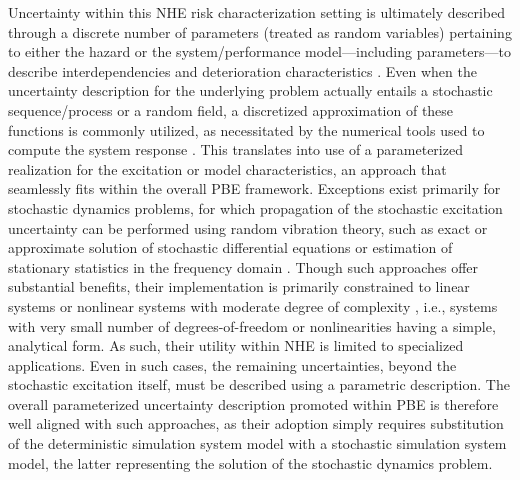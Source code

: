 Uncertainty within this NHE risk characterization setting is ultimately described through a discrete number of parameters (treated as random variables) pertaining to either the hazard or the system/performance model---including parameters---to describe interdependencies and deterioration characteristics \citep{jia2018statedependent,akiyama2020lifecycle}. Even when the uncertainty description for the underlying problem actually entails a stochastic sequence/process or a random field, a discretized approximation of these functions is commonly utilized, as necessitated by the numerical tools used to compute the system response \citep{gidaris2014surrogate}. This translates into use of a parameterized realization for the excitation or model characteristics, an approach that seamlessly fits within the overall PBE framework. Exceptions exist primarily for stochastic dynamics problems, for which propagation of the stochastic excitation uncertainty can be performed using random vibration theory, such as exact or approximate solution of stochastic differential equations or estimation of stationary statistics in the frequency domain \citep{li2009stochastic}. Though such approaches offer substantial benefits, their implementation is primarily constrained to linear systems or nonlinear systems with moderate degree of complexity \citep{dossantos2016incremental, wang2016tailequivalent}, i.e., systems with very small number of degrees-of-freedom or nonlinearities having a simple, analytical form. As such, their utility within NHE is limited to specialized applications. Even in such cases, the remaining uncertainties, beyond the stochastic excitation itself, must be described using a parametric description. The overall parameterized uncertainty description promoted within PBE is therefore well aligned with such approaches, as their adoption simply requires substitution of the deterministic simulation system model with a stochastic simulation system model, the latter representing the solution of the stochastic dynamics problem.

